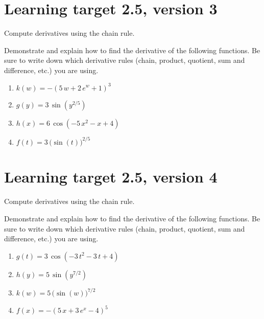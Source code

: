 \pagebreak

\section{Learning target 2.5, version 3}

Compute derivatives using the chain rule.

\hrulefill

Demonstrate and explain how to find the derivative of the following functions. Be sure to write down which derivative rules (chain, product, quotient, sum and difference, etc.) you are using.

\begin{enumerate}
    \item \(k(w)= -{\left(5 \, w + 2 \, e^{w} + 1\right)}^{3}\)
    \vfill
    \item \(g(y)= 3 \, \sin\left(y^{2/5}\right)\)
    \vfill
    \item \(h(x)= 6 \, \cos\left(-5 \, x^{2} - x + 4\right)\)
    \vfill
    \item \(f(t)= 3 \, \Big(\sin\left(t\right)\Big)^{2/5}\)
    \vfill
\end{enumerate}

\pagebreak

\section{Learning target 2.5, version 4}

Compute derivatives using the chain rule.

\hrulefill

Demonstrate and explain how to find the derivative of the following functions. Be sure to write down which derivative rules (chain, product, quotient, sum and difference, etc.) you are using.

\begin{enumerate}
    \item \(g(t)= 3 \, \cos\left(-3 \, t^{2} - 3 \, t + 4\right)\)
    \vfill
    \item \(h(y)= 5 \, \sin\left(y^{7/2}\right)\)
    \vfill
    \item \(k(w)= 5 \, \Big(\sin\left(w\right)\Big)^{7/2}\)
    \vfill
    \item \(f(x)= -{\left(5 \, x + 3 \, e^{x} - 4\right)}^{5}\)
    \vfill
\end{enumerate}

\pagebreak

